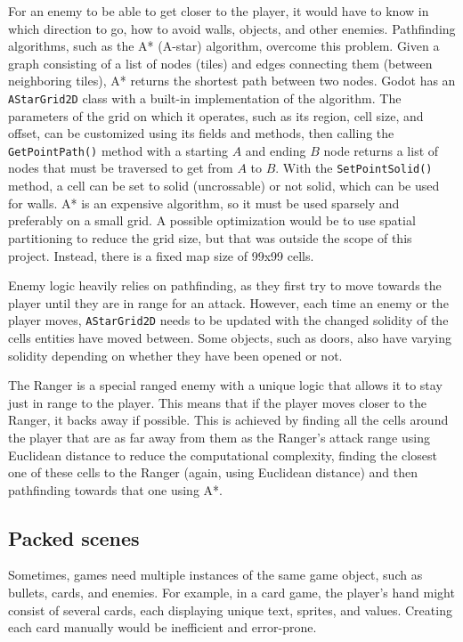 For an enemy to be able to get closer to the player, it would have to know in which direction to go, how to avoid walls, objects, and other enemies. Pathfinding algorithms, such as the A* (A-star) algorithm, overcome this problem. Given a graph consisting of a list of nodes (tiles) and edges connecting them (between neighboring tiles), A* returns the shortest path between two nodes. Godot has an \verb|AStarGrid2D| class with a built-in implementation of the algorithm. The parameters of the grid on which it operates, such as its region, cell size, and offset, can be customized using its fields and methods, then calling the \verb|GetPointPath()| method with a starting \(A\) and ending \(B\) node returns a list of nodes that must be traversed to get from \(A\) to \(B\). With the \verb|SetPointSolid()| method, a cell can be set to solid (uncrossable) or not solid, which can be used for walls. A* is an expensive algorithm, so it must be used sparsely and preferably on a small grid. A possible optimization would be to use spatial partitioning to reduce the grid size, but that was outside the scope of this project. Instead, there is a fixed map size of 99x99 cells.

Enemy logic heavily relies on pathfinding, as they first try to move towards the player until they are in range for an attack. However, each time an enemy or the player moves, \verb|AStarGrid2D| needs to be updated with the changed solidity of the cells entities have moved between. Some objects, such as doors, also have varying solidity depending on whether they have been opened or not.

The Ranger is a special ranged enemy with a unique logic that allows it to stay just in range to the player. This means that if the player moves closer to the Ranger, it backs away if possible. This is achieved by finding all the cells around the player that are as far away from them as the Ranger's attack range using Euclidean distance to reduce the computational complexity, finding the closest one of these cells to the Ranger (again, using Euclidean distance) and then pathfinding towards that one using A*.



\subsection{Packed scenes}

Sometimes, games need multiple instances of the same game object, such as bullets, cards, and enemies. For example, in a card game, the player's hand might consist of several cards, each displaying unique text, sprites, and values. Creating each card manually would be inefficient and error-prone.

